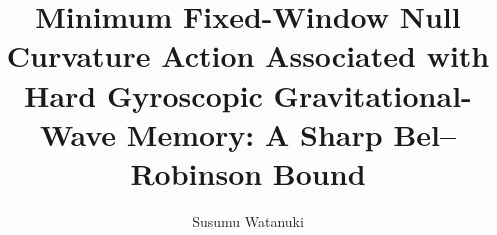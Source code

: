 \documentclass[aps,prd,preprint,onecolumn,nofootinbib,longbibliography]{revtex4-2}
\theoremstyle{definition}
\begin{document}
\title{Minimum Fixed-Window Null Curvature Action Associated with Hard Gyroscopic Gravitational-Wave Memory: A Sharp Bel--Robinson Bound}

\author{Susumu Watanuki}







\end{document}
